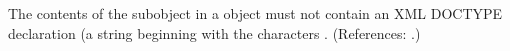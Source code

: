 The contents of the \Message subobject in a \Constraint object must not
contain an XML DOCTYPE declaration (\ie a string beginning with the
characters .  (References: .)
